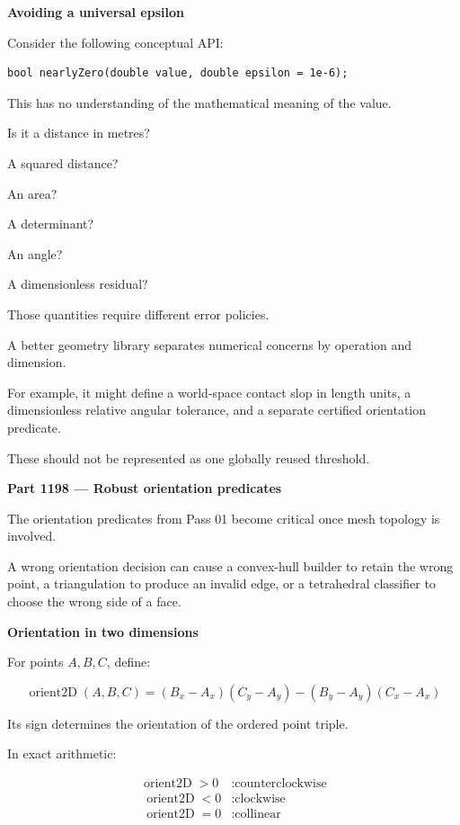 \textbf{Avoiding a universal epsilon}

Consider the following conceptual API:

\begin{verbatim}
bool nearlyZero(double value, double epsilon = 1e-6);
\end{verbatim}

This has no understanding of the mathematical meaning of the value.

Is it a distance in metres?

A squared distance?

An area?

A determinant?

An angle?

A dimensionless residual?

Those quantities require different error policies.

A better geometry library separates numerical concerns by operation and dimension.

For example, it might define a world-space contact slop in length units, a dimensionless relative angular tolerance, and a separate certified orientation predicate.

These should not be represented as one globally reused threshold.

\textbf{Part 1198 --- Robust orientation predicates}

The orientation predicates from Pass 01 become critical once mesh topology is involved.

A wrong orientation decision can cause a convex-hull builder to retain the wrong point, a triangulation to produce an invalid edge, or a tetrahedral classifier to choose the wrong side of a face.

\textbf{Orientation in two dimensions}

For points \(A,B,C\), define:

\[
\boxed{ \operatorname{orient2D}(A,B,C)= (B_x-A_x)(C_y-A_y) - (B_y-A_y)(C_x-A_x) }
\]

Its sign determines the orientation of the ordered point triple.

In exact arithmetic:

\[
\begin{aligned} \operatorname{orient2D}>0 &: \text{counterclockwise}\\\ \operatorname{orient2D}<0 &: \text{clockwise}\\\ \operatorname{orient2D}=0 &: \text{collinear} \end{aligned}
\]

